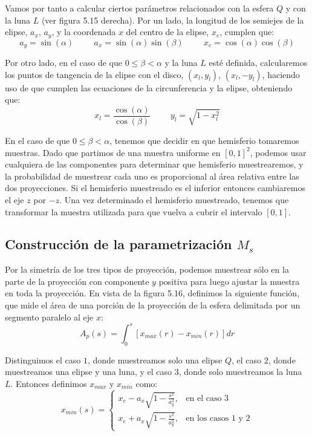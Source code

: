 Vamos por tanto a calcular ciertos parámetros relacionados con la esfera $Q$ y con la luna $L$ (ver figura 5.15 derecha). Por un lado, la longitud de los semiejes de la elipse, $a_x$, $a_y$, y la coordenada $x$ del centro de la elipse, $x_e$, cumplen que:
$$a_y=\sin(\alpha) \hspace{1cm} a_x=\sin(\alpha)\sin(\beta) \hspace{1cm} x_e=\cos(\alpha)\cos(\beta)$$

Por otro lado, en el caso de que $0\leq\beta<\alpha$ y la luna $L$ esté definida, calcularemos los puntos de tangencia de la elipse con el disco, $(x_l,y_l)$, $(x_l,-y_l)$, haciendo uso de que cumplen las ecuaciones de la circunferencia y la elipse, obteniendo que:
$$x_l = \frac{\cos(\alpha)}{\cos(\beta)}\hspace{1cm} y_l=\sqrt{1-x_l^2}$$

En el caso de que $0\leq\beta<\alpha$, tenemos que decidir en que hemisferio tomaremos muestras. Dado que partimos de una muestra uniforme en $[0,1]^2$, podemos usar cualquiera de las componentes para determinar que hemisferio muestrearemos, y la probabilidad de muestrear cada uno es proporcional al área relativa entre las dos proyecciones. Si el hemisferio muestreado es el inferior entonces cambiaremos el eje $z$ por $-z$. Una vez determinado el hemisferio muestreado, tenemos que transformar la muestra utilizada para que vuelva a cubrir el intervalo $[0,1]$.

\subsection{Construcción de la parametrización $M_s$}
Por la simetría de los tres tipos de proyección, podemos muestrear sólo en la parte de la proyección con componente $y$ positiva para luego ajustar la muestra en toda la proyección. En vista de la figura 5.16, definimos la siguiente función, que mide el área de una porción de la proyección de la esfera delimitada por un segmento paralelo al eje $x$:
$$A_p(s) = \int_0^s [x_{max}(r)-x_{min}(r)]dr $$

Distinguimos el caso $1$, donde muestreamos solo una elipse $Q$, el caso $2$, donde muestreamos una elipse y una luna, y el caso $3$, donde solo muestreamos la luna $L$. Entonces definimos $x_{max}$ y $x_{min}$ como:
\[ x_{min}(s) = 
   \begin{cases} 
     x_e-a_x\sqrt{1-\frac{s^2}{a_y^2}},  & \text{en el caso $3$}  \\
     x_e+a_x\sqrt{1-\frac{s^2}{a_y^2}},  & \text{en los casos $1$ y $2$}
   \end{cases}
  \]

